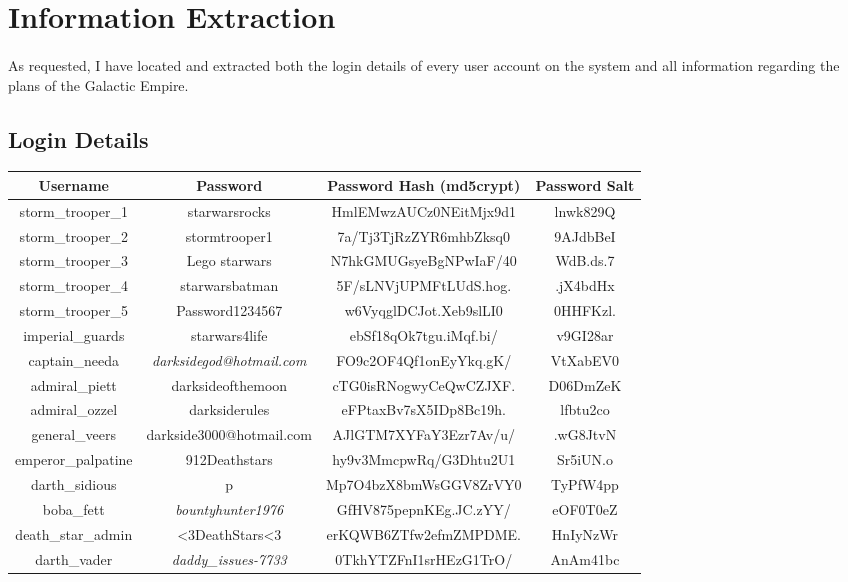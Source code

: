 \documentclass{article}
\begin{document}
\newpage

\section{Information Extraction}
\paragraph{}
As requested, I have located and extracted both the login details of every user account on the system and all information regarding the plans of the Galactic Empire.

\subsection{Login Details}

\begin{adjustwidth}{-1.5cm}{}
\begin{tabular}{ |c|c|c|c| }
\hline
\textbf{Username} & \textbf{Password} & \textbf{Password Hash (md5crypt)} & \textbf{Password Salt} \\
\hline
storm\_trooper\_1 & starwarsrocks & HmlEMwzAUCz0NEitMjx9d1 & lnwk829Q \\
\hline
storm\_trooper\_2 & stormtrooper1 & 7a/Tj3TjRzZYR6mhbZksq0 & 9AJdbBeI \\
\hline
storm\_trooper\_3 & Lego starwars & N7hkGMUGsyeBgNPwIaF/40 & WdB.ds.7 \\
\hline
storm\_trooper\_4 & starwarsbatman & 5F/sLNVjUPMFtLUdS.hog. & .jX4bdHx \\
\hline
storm\_trooper\_5 & Password1234567 & w6VyqglDCJot.Xeb9slLI0 & 0HHFKzl. \\
\hline
imperial\_guards & starwars4life & ebSf18qOk7tgu.iMqf.bi/ & v9GI28ar \\
\hline
captain\_needa & \emph{darksidegod@hotmail.com} & FO9c2OF4Qf1onEyYkq.gK/ & VtXabEV0 \\
\hline
admiral\_piett & darksideofthemoon & cTG0isRNogwyCeQwCZJXF. & D06DmZeK \\
\hline
admiral\_ozzel & darksiderules & eFPtaxBv7sX5IDp8Bc19h. & lfbtu2co \\
\hline
general\_veers & darkside3000@hotmail.com & AJlGTM7XYFaY3Ezr7Av/u/ & .wG8JtvN \\
\hline
emperor\_palpatine & 912Deathstars & hy9v3MmcpwRq/G3Dhtu2U1 & Sr5iUN.o \\
\hline
darth\_sidious & p & Mp7O4bzX8bmWsGGV8ZrVY0 & TyPfW4pp \\
\hline
boba\_fett & \emph{bountyhunter1976} & GfHV875pepnKEg.JC.zYY/ & eOF0T0eZ \\
\hline
death\_star\_admin & \textless 3DeathStars\textless 3 & erKQWB6ZTfw2efmZMPDME. & HnIyNzWr \\
\hline
darth\_vader & \emph{daddy\_issues-7733} & 0TkhYTZFnI1srHEzG1TrO/ & AnAm41bc \\
\hline
\end{tabular}
\end{adjustwidth}
\newpage
\end{document}
